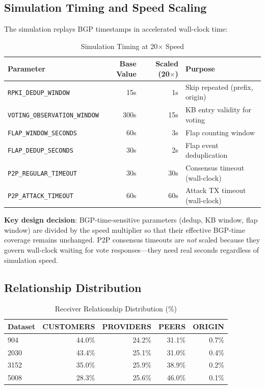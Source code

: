 \documentclass[11pt,a4paper]{article}
\begin{document}
\subsection{Simulation Timing and Speed Scaling}

The simulation replays BGP timestamps in accelerated wall-clock time:

\begin{table}[H]
\centering
\caption{Simulation Timing at 20$\times$ Speed}
\begin{tabular}{lrrl}
\toprule
\textbf{Parameter} & \textbf{Base Value} & \textbf{Scaled (20$\times$)} & \textbf{Purpose} \\
\midrule
\texttt{RPKI\_DEDUP\_WINDOW}       & 15s   & 1s   & Skip repeated (prefix, origin) \\
\texttt{VOTING\_OBSERVATION\_WINDOW} & 300s & 15s  & KB entry validity for voting \\
\texttt{FLAP\_WINDOW\_SECONDS}     & 60s   & 3s   & Flap counting window \\
\texttt{FLAP\_DEDUP\_SECONDS}      & 30s   & 2s   & Flap event deduplication \\
\texttt{P2P\_REGULAR\_TIMEOUT}     & 30s   & 30s  & Consensus timeout (wall-clock) \\
\texttt{P2P\_ATTACK\_TIMEOUT}      & 60s   & 60s  & Attack TX timeout (wall-clock) \\
\bottomrule
\end{tabular}
\end{table}

\textbf{Key design decision}: BGP-time-sensitive parameters (dedup, KB window,
flap window) are divided by the speed multiplier so that their effective
BGP-time coverage remains unchanged. P2P consensus timeouts are \emph{not}
scaled because they govern wall-clock waiting for vote responses---they need
real seconds regardless of simulation speed.

\subsection{Relationship Distribution}

\begin{table}[H]
\centering
\caption{Receiver Relationship Distribution (\%)}
\begin{tabular}{lrrrr}
\toprule
\textbf{Dataset} & \textbf{CUSTOMERS} & \textbf{PROVIDERS} & \textbf{PEERS} & \textbf{ORIGIN} \\
\midrule
904   & 44.0\% & 24.2\% & 31.1\% & 0.7\% \\
2030  & 43.4\% & 25.1\% & 31.0\% & 0.4\% \\
3152  & 35.0\% & 25.9\% & 38.9\% & 0.2\% \\
5008  & 28.3\% & 25.6\% & 46.0\% & 0.1\% \\
\bottomrule
\end{tabular}
\end{table}
\end{document}
